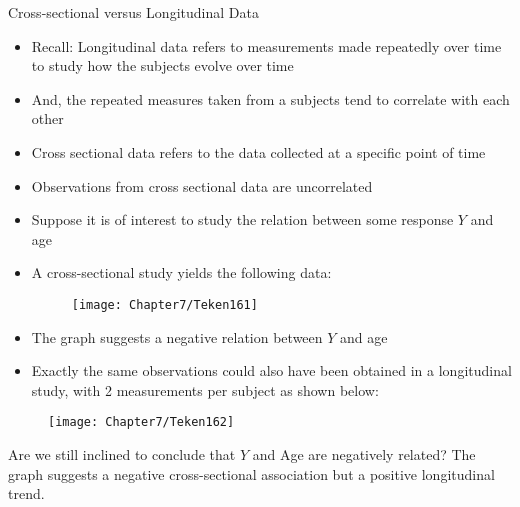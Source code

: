 \documentclass{beamer}
\begin{document}
\begin{frame}{Cross-sectional versus Longitudinal Data}
\begin{itemize}
	\item Recall: Longitudinal data refers to measurements made repeatedly over time to study how the subjects evolve over time \vspace{0.25cm}
	\item And, the repeated measures taken from a subjects tend to correlate with each other \vspace{0.25cm}
	\item Cross sectional data refers to the data collected at a specific point of time \vspace{0.25cm}
	\item Observations from cross sectional data are uncorrelated
\end{itemize}
\end{frame}

\begin{frame}
\begin{itemize}
\item Suppose it is of interest to study the relation between some response $Y$ and age

\item A cross-sectional study yields the following data:
\begin{figure}[h!]
	\centering
	\texttt{[image: Chapter7/Teken161]}
\end{figure}

\end{itemize}
\end{frame}

\begin{frame}
\begin{itemize}
\item The graph suggests a negative relation between $Y$ and age \vspace{0.5cm}
\item Exactly the same observations could also have been obtained in a longitudinal study, with 2 measurements per subject as shown below:
\end{itemize}
\end{frame}

\begin{frame}
\text{{\textcolor{blue}{First case:}}}
\begin{figure}[h!]
\centering
\texttt{[image: Chapter7/Teken162]}
\end{figure}
Are we still inclined to conclude that $Y$ and Age are negatively related? The graph suggests a
negative cross-sectional association but a positive longitudinal trend.
\end{frame}
\end{document}
